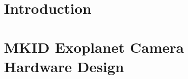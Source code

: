 \documentclass[oneside,12pt,final]{sty/ucthesis-CA2012}
\begin{document}
\begin{frontmatter}
	
	\maketitle
	\approvalpage
	\copyrightpage
	
	
	
	\tableofcontents
    \listoffigures
    \listoftables
\end{frontmatter}

\begin{mainmatter}

\pagestyle{fancy}
\renewcommand{\chaptermark}[1]{\markboth{{\sf #1 \hspace*{\fill} Chapter~\thechapter}}{} }
\renewcommand{\sectionmark}[1]{\markright{ {\sf Section~\thesection \hspace*{\fill} #1 }}}
\fancyhf{}

\makeatletter \if@twoside \fancyhead[LO]{\small \rightmark} \fancyhead[RE]{\small\leftmark} \else \fancyhead[LO]{\small\leftmark}
\fancyhead[RE]{\small\rightmark} \fi

\def\cleardoublepage{\clearpage\if@openright \ifodd\c@page\else
  \hbox{}
  \vspace*{\fill}
  \begin{center}
    This page intentionally left blank
  \end{center}
  \vspace{\fill}
  \thispagestyle{plain}
  \newpage
  \fi \fi}
\makeatother
\fancyfoot[c]{\textrm{\textup{\thepage}}} %
\fancyfoot[C]{\thepage}
\renewcommand{\headrulewidth}{0.4pt}

 { \fancyhf{} \fancyfoot[C]{\thepage}
\renewcommand{\headrulewidth}{0pt}
\renewcommand{\footrulewidth}{0pt}}

\chapter{Introduction}


\chapter{MKID Exoplanet Camera Hardware Design}



\end{mainmatter}
\end{document}
